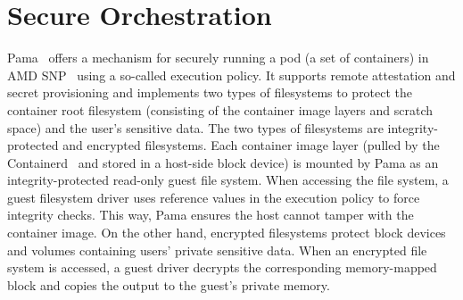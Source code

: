 \section{Secure Orchestration}
Pama~\cite*{Johnson2023ParmaCC} offers a mechanism for securely running a pod (a set of containers) in AMD SNP~\cite*{SEV_SNP_white_book} using a so-called execution policy. It supports remote attestation and secret provisioning and implements two types of filesystems to protect the container root filesystem 
(consisting of the container image layers and scratch space) and the user's sensitive data. The two types of filesystems are integrity-protected and encrypted filesystems. Each container image layer (pulled by the Containerd~\cite*{containerd} and stored in a host-side block device) is mounted by Pama as an 
integrity-protected read-only guest file system. When accessing the file system, a guest filesystem driver uses reference values in the execution policy to force integrity checks. This way, Pama ensures the host cannot tamper with the container image.
On the other hand, encrypted filesystems protect block devices and volumes containing users' private sensitive data. When an encrypted file system is accessed, a guest driver decrypts the corresponding memory-mapped block and copies the output to the guest's private memory. 
